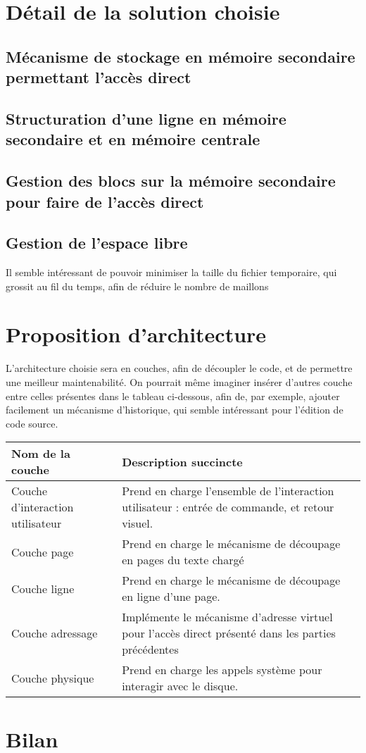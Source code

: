 \section{Détail de la solution choisie}

\subsection{Mécanisme de stockage en mémoire secondaire permettant l'accès direct}

\subsection{Structuration d'une ligne en mémoire secondaire et en mémoire
    centrale}

\subsection{Gestion des blocs sur la mémoire secondaire pour faire de l'accès
    direct}

\subsection{Gestion de l'espace libre}
Il semble intéressant de pouvoir minimiser la taille du fichier temporaire, qui
grossit au fil du temps, afin de réduire le nombre de maillons

\section{Proposition d'architecture}
L'architecture choisie sera en couches, afin de découpler le code, et de
permettre une meilleur maintenabilité. On pourrait même imaginer insérer
d'autres couche entre celles présentes dans le tableau ci-dessous, afin de, par
exemple, ajouter facilement un mécanisme d'historique, qui semble intéressant
pour l'édition de code source.

\begin{center}
\begin{tabular}{l|p{7cm}}
Nom de la couche & Description succincte \\
\hline \hline
Couche d'interaction utilisateur & Prend en charge l'ensemble de l'interaction
utilisateur : entrée de commande, et retour visuel.\\
\hline
Couche page & Prend en charge le mécanisme de découpage en pages du texte chargé
\\
	\hline
Couche ligne & Prend en charge le mécanisme de découpage en ligne d'une page.
\\
	\hline
Couche adressage & Implémente le mécanisme d'adresse virtuel pour l'accès direct
présenté dans les parties précédentes\\
\hline
Couche physique & Prend en charge les appels système pour interagir avec le
disque.\\
	\hline
	\end{tabular}
	\end{center}


\section{Bilan}
